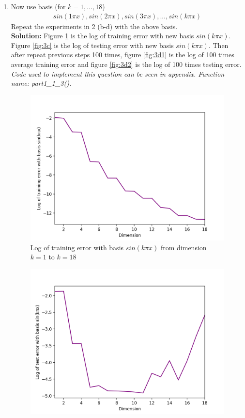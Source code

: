 \documentclass[A4,12pt]{article}
\begin{document}
\begin{enumerate}[1.]
    \item Now use basis (for $k = 1,...,18$)
      \begin{align}\nonumber
      sin(1 \pi x), sin(2 \pi x), sin(3 \pi x),...,sin(k \pi x)
      \end{align}
    Repeat the experiments in 2 (b-d) with the above basis.\\
    \textbf{Solution:} Figure \ref{fig:3b} is the log of training error with new basis $sin(k \pi x)$. Figure \ref{fig:3c} is the log of testing error with new basis $sin(k \pi x)$. Then after repeat previous steps 100 times, figure \ref{fig:3d1} is the log of 100 times average training error and figure \ref{fig:3d2} is the log of 100 times testing error.\\
    \textit{Code used to implement this question can be seen in appendix. Function name: part1\_1\_3().}
      \begin{figure}
        \centering \includegraphics[width=0.8\columnwidth]{3b}
        \caption{
          \label{fig:3b}
          Log of training error with basis $sin(k \pi x)$ from dimension $k=1$ to $k=18$
        }
      \end{figure}
      \begin{figure}
        \centering \includegraphics[width=0.8\columnwidth]{3c}

\end{figure}
\end{enumerate}
\end{document}
